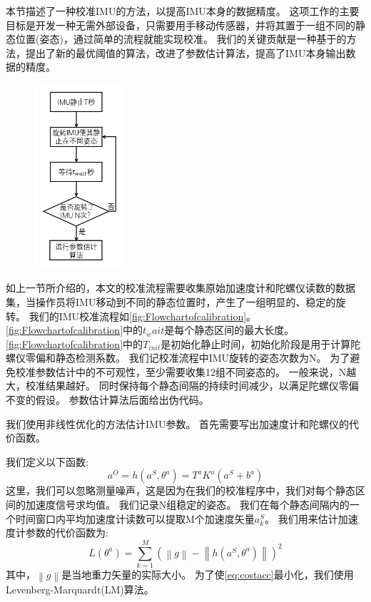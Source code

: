 \documentclass[
  type=master
]{gdutthesis}
\begin{document}
本节描述了一种校准IMU的方法，以提高IMU本身的数据精度。
这项工作的主要目标是开发一种无需外部设备，只需要用手移动传感器，并将其置于一组不同的静态位置(姿态)，通过简单的流程就能实现校准。
我们的关键贡献是一种基于\cite{tedaldi2014robust}的方法，提出了新的最优阈值的算法，改进了参数估计算法，提高了IMU本身输出数据的精度。
\begin{figure}[htbp]
	\centering
	\includegraphics[width=0.3\textwidth]{屏幕截图 2022-04-03 100222.png}
	\label{fig:Flowchartofcalibration}
\end{figure}

如上一节所介绍的，本文的校准流程需要收集原始加速度计和陀螺仪读数的数据集，当操作员将IMU移动到不同的静态位置时，产生了一组明显的、稳定的旋转。
我们的IMU校准流程如\autoref{fig:Flowchartofcalibration}。
\autoref{fig:Flowchartofcalibration}中的$t_wait$是每个静态区间的最大长度。
\autoref{fig:Flowchartofcalibration}中的$T_{init}$是初始化静止时间，初始化阶段是用于计算陀螺仪零偏和静态检测系数。
我们记校准流程中IMU旋转的姿态次数为N。
为了避免校准参数估计中的不可观性，至少需要收集12组不同姿态的。
一般来说，N越大，校准结果越好。
同时保持每个静态间隔的持续时间减少，以满足陀螺仪零偏不变的假设。
参数估计算法后面给出伪代码。

我们使用非线性优化的方法估计IMU参数。
首先需要写出加速度计和陀螺仪的代价函数。

我们定义以下函数:
\begin{equation}
	a^O=h(a^S,\theta^a) =T^a K^a (a^S + b^a)
\end{equation}
这里，我们可以忽略测量噪声，这是因为在我们的校准程序中，我们对每个静态区间的加速度信号求均值。
我们记录N组稳定的姿态。
我们在每个静态间隔内的一个时间窗口内平均加速度计读数可以提取M个加速度矢量$a^S_k$。
我们用来估计加速度计参数的代价函数为:
\begin{equation}\label{eq:costacc}
	L(\theta^a)=\sum_{k=1}^{M}(\left\|g\right\|-\left\|h(a^S,\theta^a)\right\|)^2
\end{equation}
其中，$\left\|g\right\|$是当地重力矢量的实际大小。
为了使\autoref{eq:costacc}最小化，我们使用Levenberg-Marquardt(LM)算法。
\end{document}
